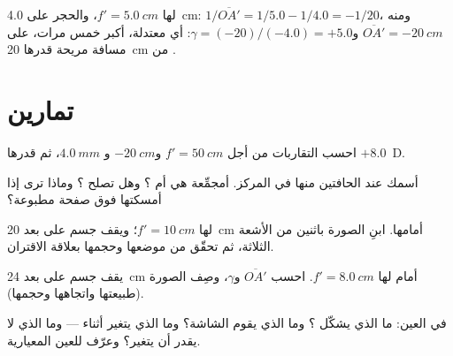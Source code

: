 \begin{example}\label{ex:g11:lenses-and-eye:magnifier}
 لها $f' = \qty{5.0}{cm}$، والحجر على \qty{4.0}{cm}:
$1/\overline{OA'} = 1/5.0 - 1/4.0 = -1/20$، ومنه
$\overline{OA'} = \qty{-20}{cm}$ و$\gamma = (-20)/(-4.0) = +5.0$: أي
 معتدلة، أكبر خمس مرات، على مسافة مريحة قدرها \qty{20}{cm}
من .
\end{example}

\section{تمارين}

\begin{exercise}[$\star$]\label{exo:g11:lenses-and-eye:1}
احسب التقاربات من أجل $f' = \qty{50}{cm}$ و$\qty{-20}{cm}$ و
$\qty{4.0}{mm}$، ثم   قدرها $+8.0$~D.
\end{exercise}

\begin{exercise}[$\star$]\label{exo:g11:lenses-and-eye:2}
 أسمك عند الحافتين منها في المركز. أمجمِّعة هي أم
؟ وهل تصلح ؟ وماذا ترى إذا أمسكتها
فوق صفحة مطبوعة؟
\end{exercise}

\begin{exercise}[$\star$]\label{exo:g11:lenses-and-eye:3}
 لها $f' = \qty{10}{cm}$؛ ويقف جسم على بعد
\qty{20}{cm} أمامها. ابنِ الصورة باثنين من الأشعة الثلاثة،
ثم تحقّق من موضعها وحجمها بعلاقة الاقتران.
\end{exercise}

\begin{exercise}[$\star$]\label{exo:g11:lenses-and-eye:4}
يقف جسم على بعد \qty{24}{cm} أمام  لها
$f' = \qty{8.0}{cm}$. احسب $\overline{OA'}$ و$\gamma$،
وصِف الصورة (طبيعتها واتجاهها وحجمها).
\end{exercise}

\begin{exercise}[$\star$]\label{exo:g11:lenses-and-eye:5}
في العين: ما الذي يشكّل ؟ وما الذي يقوم  الشاشة؟ وما الذي
يتغير أثناء  --- وما الذي لا يقدر أن يتغير؟ وعرّف 
للعين المعيارية.
\end{exercise}

